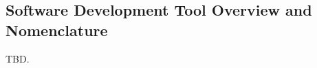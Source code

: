%
%
%
%


\subsection{Software Development Tool Overview and Nomenclature}
\label{cldd0:snom0:ssdt0}

TBD.

